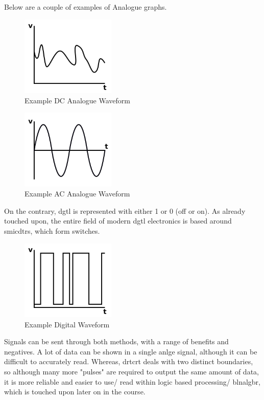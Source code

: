 \documentclass[a4paper,11pt]{report}
\begin{document}
Below are a couple of examples of Analogue graphs.

\begin{figure}[H]
\centering
\includegraphics[width=0.4\textwidth]{analogue}
\caption{Example DC Analogue Waveform}
\end{figure}

\begin{figure}[H]
\centering
\includegraphics[width=0.4\textwidth]{analogue2}
\caption{Example AC Analogue Waveform}
\end{figure}

On the contrary, \gls{dgtl} is represented with either 1 or 0 (off or on). As already touched upon, the entire field of modern \gls{dgtl} electronics is based around \gls{smicdtr}s, which form switches.

\begin{figure}[H]
\centering
\includegraphics[width=0.4\textwidth]{digital}
\caption{Example Digital Waveform}
\end{figure}

Signals can be sent through both methods, with a range of benefits and negatives. A lot of data can be shown in a single \gls{anlge} signal, although it can be difficult to accurately read. Whereas, \gls{drtcrt} deals with two distinct boundaries, so although many more "pulses" are required to output the same amount of data, it is more reliable and easier to use/ read within logic based processing/ \gls{blnalgbr}, which is touched upon later on in the course.
\end{document}
